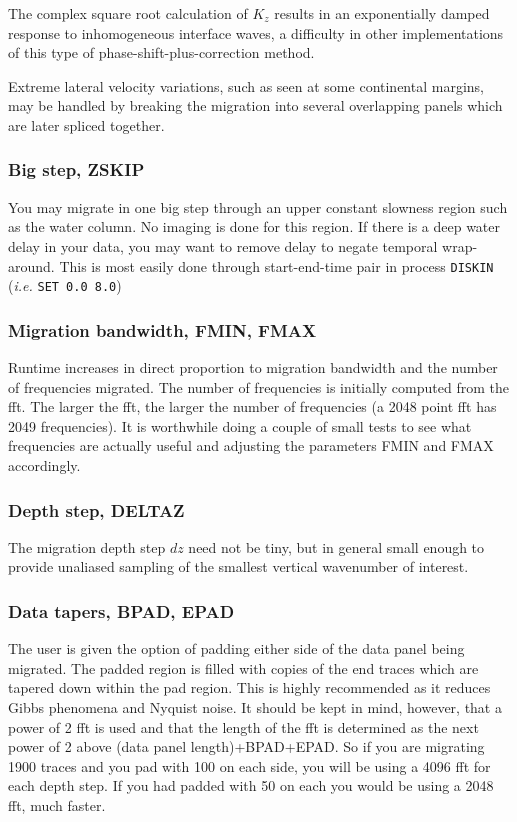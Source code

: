 The complex square root calculation of $K_{z}$ results in an exponentially
damped response to inhomogeneous interface waves, a difficulty in
other implementations of this type of phase-shift-plus-correction
method.

Extreme lateral velocity variations, such as seen at some
continental margins, may be handled by breaking the migration
into several overlapping panels which are later spliced together.

\subsubsection{Big step, ZSKIP}
   You may migrate in one big step through an upper constant
   slowness region such as the water column.  No imaging is done
   for this region.  If there is a deep water delay in your data,
   you may want to remove delay to negate temporal wrap-around.
   This is most easily done through start-end-time pair in process
   \texttt{DISKIN} (\textit{i.e.} \texttt{SET 0.0 8.0})

\subsubsection{Migration bandwidth, FMIN, FMAX}
   Runtime increases in direct proportion to migration bandwidth
   and the number of frequencies migrated.  The number of frequencies
   is initially computed from the \gls{fft}.  The larger the \gls{fft}, the larger
   the number of frequencies (a 2048 point \gls{fft} has 2049 frequencies).
   It is worthwhile doing a couple of small tests to see what
   frequencies are actually useful and adjusting the parameters
   FMIN and FMAX accordingly.

\subsubsection{Depth step, DELTAZ}
   The migration depth step $dz$ need not be tiny, but in general small
   enough to provide unaliased sampling of the smallest vertical
   wavenumber of interest.

\subsubsection{Data tapers, BPAD, EPAD}
   The user is given the option of padding either side of the data
   panel being migrated. The padded region is filled with copies of
   the end traces which are tapered down within the pad region. This
   is highly recommended as it reduces Gibbs phenomena and Nyquist
   noise.  It should be kept in mind, however, that a power of 2 \gls{fft}
   is used and that the length of the \gls{fft} is determined as the next
   power of 2 above (data panel length)+BPAD+EPAD.  So if you are
   migrating 1900 traces and you pad with 100 on each side, you will
   be using a 4096 \gls{fft} for each depth step. If you had padded with 50
   on each you would be using a 2048 \gls{fft}, much faster.

